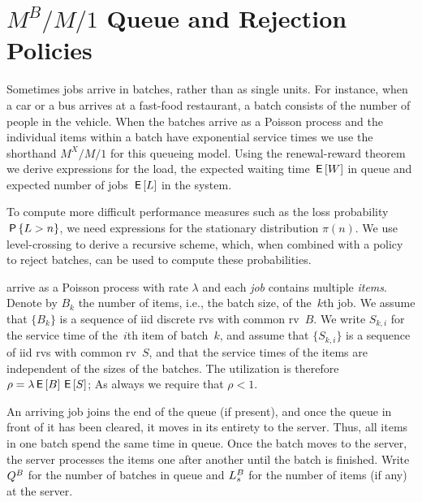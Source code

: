 \documentclass[queueing-book.tex]{subfiles}
\begin{document}
\section{\texorpdfstring{$M^B/M/1$}{MBM1pk} Queue and Rejection Policies}
\label{sec:mxm1-queue:-expected}

Sometimes jobs arrive in batches, rather than as single units.
For instance, when a car or a bus arrives at a fast-food restaurant, a batch consists of the number of people in the vehicle.
When the batches arrive as a Poisson process and the individual items within a batch have exponential service times we use the shorthand $M^X/M/1$ for this queueing model.
Using the renewal-reward theorem we derive expressions for the load, the expected waiting time  $\,\mathsf{E}\left[W\right]$ in queue and expected number of jobs $\,\mathsf{E}\left[L\right]$ in the system.

To compute more difficult performance measures such as the loss probability $\,\mathsf{P}\left\{L>n\right\}$, we need expressions for the stationary distribution $\pi(n)$.
We use level-crossing to derive a recursive scheme, which, when combined with a policy to reject batches, can be used to compute these probabilities.


 arrive as a Poisson process with rate $\lambda$ and each \emph{job} contains multiple \emph{items}.
Denote by $B_k$ the number of items, i.e., the batch size, of the~$k$th job.
We assume that $\{B_k\}$ is a sequence of iid discrete rvs with common rv~$B$.
We write $S_{k,i}$ for the service time of the~$i$th item of batch~$k$, and assume that $\{S_{k, i}\}$ is a sequence of iid rvs with common rv~$S$, and that the service times of the items are independent of the sizes of the batches.
The utilization is therefore
$\rho = \lambda \,\mathsf{E}\left[B\right] \,\mathsf{E}\left[S\right]$;
As always we require that $\rho<1$.


An arriving job joins the end of the queue (if present), and once the queue in front of it has been cleared, it moves in its entirety to the server.
Thus, all items in one batch spend the same time in queue.
Once the batch moves to the server, the server processes the items one after another until the batch is finished.
Write $Q^B$ for the number of batches in queue and $L_s^B$ for the number of items (if any) at the server.
\end{document}
